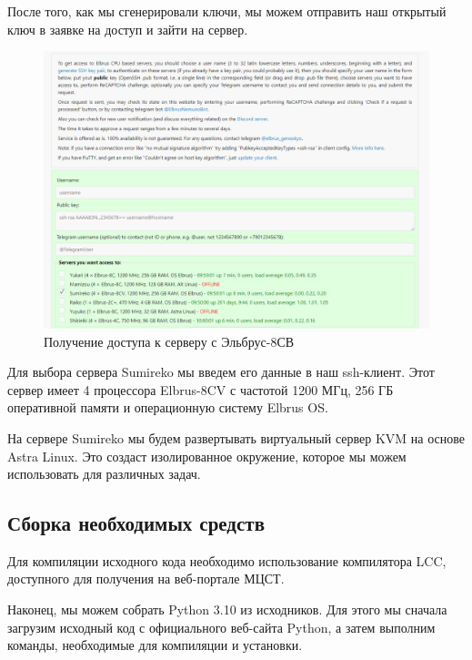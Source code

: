 \begin{listing}[H]
\end{listing}
\label{lst:c}

После того, как мы сгенерировали ключи, мы можем отправить наш открытый ключ в заявке на доступ и зайти на сервер.

\begin{figure}
  \centering
  \includegraphics[width=.9\textwidth]{graphics/img/elbrus_dostyp.png}
  \caption{Получение доступа к серверу с Эльбрус-8СВ}
  \label{fig:elbrus-dostup}
\end{figure}

Для выбора сервера Sumireko мы введем его данные в наш ssh-клиент. Этот сервер имеет 4 процессора Elbrus-8CV с частотой 1200 МГц, 256 ГБ оперативной памяти и операционную систему Elbrus OS.

На сервере Sumireko мы будем развертывать виртуальный сервер KVM на основе Astra Linux. Это создаст изолированное окружение, которое мы можем использовать для различных задач.

\subsection{Сборка необходимых средств}

Для компиляции исходного кода необходимо использование компилятора LCC, доступного для получения на веб-портале МЦСТ.

Наконец, мы можем собрать Python 3.10 из исходников. Для этого мы сначала загрузим исходный код с официального веб-сайта Python, а затем выполним команды, необходимые для компиляции и установки.

\begin{listing}[H]
\end{listing}
\label{lst:c}

